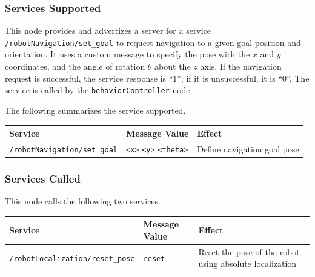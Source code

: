 \documentclass{CSSRforAfrica}
\begin{document}
{{\subsubsection*{Services Supported}
This node  provides and advertizes a server for a service {\small \verb+/robotNavigation/set_goal+} to request navigation to a given goal position and orientation. It uses a custom message to specify the pose with the $x$ and $y$ coordinates, and the angle of rotation $\theta$ about the  $z$ axis.  If the navigation request is successful, the service response is ``1''; if it is unsuccessful, it is ``0''.  
The service is called by  the {\small \verb+behaviorController+} node.

The following summarizes the service supported.

\begin{center}
\begin{tabularx}{\linewidth}{| l | l | X|}
\hline 
{\small Service }                                                                                & {\small Message Value}    &  {\small Effect}       \\
\hline
{\footnotesize \verb+/robotNavigation/set_goal+ }  & {\footnotesize \verb+<x>+ \verb+<y>+  \verb+<theta>+} & {\small Define navigation goal pose} \\ 
\hline
\end{tabularx}
\end{center}

\subsubsection*{Services Called}
This node  calls the following two services.

\begin{center}
\begin{tabularx}{\linewidth}{| l | l | X|}
\hline 
{\small Service }                                                    & {\small Message Value}    &  {\small Effect}       \\
\hline
{\footnotesize \verb+/robotLocalization/reset_pose+ }  &  {\footnotesize \verb+reset+} & {\small Reset the pose of the robot using absolute localization} \\ 
\hline
\end{tabularx}
\end{center}

}}
\end{document}
